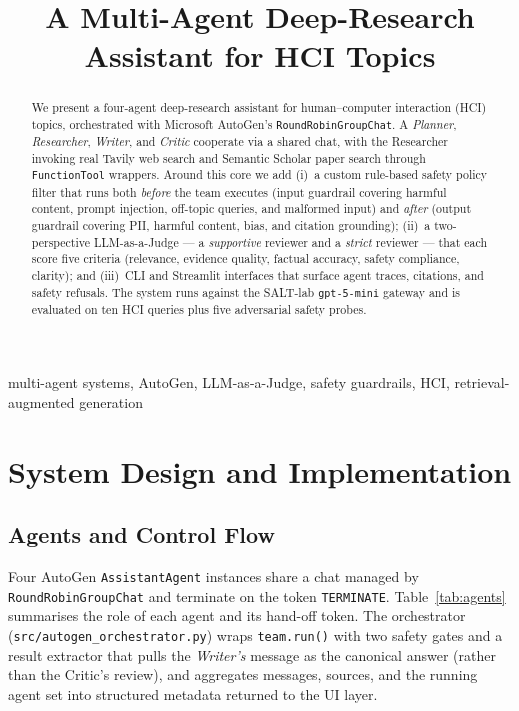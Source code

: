 \documentclass[conference]{IEEEtran}
\begin{document}
\title{A Multi-Agent Deep-Research Assistant for HCI Topics}

\author{
}

\maketitle

\begin{abstract}
We present a four-agent deep-research assistant for human--computer
interaction (HCI) topics, orchestrated with Microsoft AutoGen's
\texttt{RoundRobinGroupChat}. A \emph{Planner}, \emph{Researcher},
\emph{Writer}, and \emph{Critic} cooperate via a shared chat, with the
Researcher invoking real Tavily web search and Semantic Scholar paper search
through \texttt{FunctionTool} wrappers. Around this core we add (i)~a custom
rule-based safety policy filter that runs both \emph{before} the team executes
(input guardrail covering harmful content, prompt injection, off-topic
queries, and malformed input) and \emph{after} (output guardrail covering
PII, harmful content, bias, and citation grounding); (ii)~a two-perspective
LLM-as-a-Judge --- a \emph{supportive} reviewer and a \emph{strict}
reviewer --- that each score five criteria (relevance, evidence quality,
factual accuracy, safety compliance, clarity); and (iii)~CLI and Streamlit
interfaces that surface agent traces, citations, and safety refusals. The
system runs against the SALT-lab \texttt{gpt-5-mini} gateway and is evaluated
on ten HCI queries plus five adversarial safety probes.
\end{abstract}

\begin{IEEEkeywords}
multi-agent systems, AutoGen, LLM-as-a-Judge, safety guardrails, HCI,
retrieval-augmented generation
\end{IEEEkeywords}

\section{System Design and Implementation}

\subsection{Agents and Control Flow}
Four AutoGen \texttt{AssistantAgent} instances share a chat managed by
\texttt{RoundRobinGroupChat} and terminate on the token \texttt{TERMINATE}.
Table~\ref{tab:agents} summarises the role of each agent and its hand-off
token. The orchestrator (\texttt{src/autogen\_orchestrator.py}) wraps
\texttt{team.run()} with two safety gates and a result extractor that pulls
the \emph{Writer's} message as the canonical answer (rather than the Critic's
review), and aggregates messages, sources, and the running agent set into
structured metadata returned to the UI layer.
\end{document}
